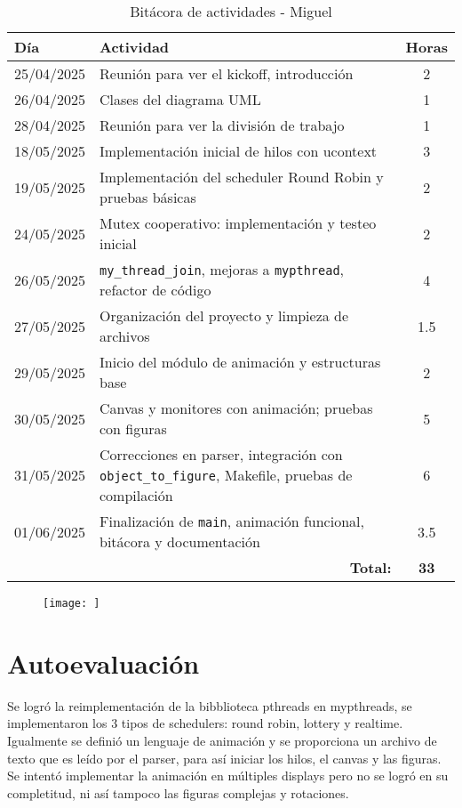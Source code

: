 \documentclass[12pt]{article}
\begin{document}
\begin{table}[H]
\centering
\caption{Bitácora de actividades - Miguel}
\begin{tabular}{|l|p{9cm}|c|}
\hline
\textbf{Día} & \textbf{Actividad} & \textbf{Horas} \\
\hline
25/04/2025 & Reunión para ver el kickoff, introducción & 2 \\
26/04/2025 & Clases del diagrama UML & 1 \\
28/04/2025 & Reunión para ver la división de trabajo & 1 \\
18/05/2025 & Implementación inicial de hilos con ucontext & 3 \\
19/05/2025 & Implementación del scheduler Round Robin y pruebas básicas & 2 \\
24/05/2025 & Mutex cooperativo: implementación y testeo inicial & 2 \\
26/05/2025 & \texttt{my\_thread\_join}, mejoras a \texttt{mypthread}, refactor de código & 4 \\
27/05/2025 & Organización del proyecto y limpieza de archivos & 1.5 \\
29/05/2025 & Inicio del módulo de animación y estructuras base & 2 \\
30/05/2025 & Canvas y monitores con animación; pruebas con figuras & 5 \\
31/05/2025 & Correcciones en parser, integración con \texttt{object\_to\_figure}, Makefile, pruebas de compilación & 6 \\
01/06/2025 & Finalización de \texttt{main}, animación funcional, bitácora y documentación & 3.5 \\
\hline
\multicolumn{2}{|r|}{\textbf{Total:}} & \textbf{33} \\
\hline
\end{tabular}
\end{table}



\begin{figure}[H]
   \centering
   \texttt{[image: ]} 
   \label{fig:1}
\end{figure}




\section{Autoevaluación}


Se logró la reimplementación de la bibblioteca pthreads en mypthreads, se implementaron los 3 tipos de schedulers: round robin, lottery y realtime. Igualmente se definió un lenguaje de animación y se proporciona un archivo de texto que es leído por el parser, para así iniciar los hilos, el canvas y las figuras. Se intentó implementar la animación en múltiples displays pero no se logró en su completitud, ni así tampoco las figuras complejas y rotaciones.
\end{document}
